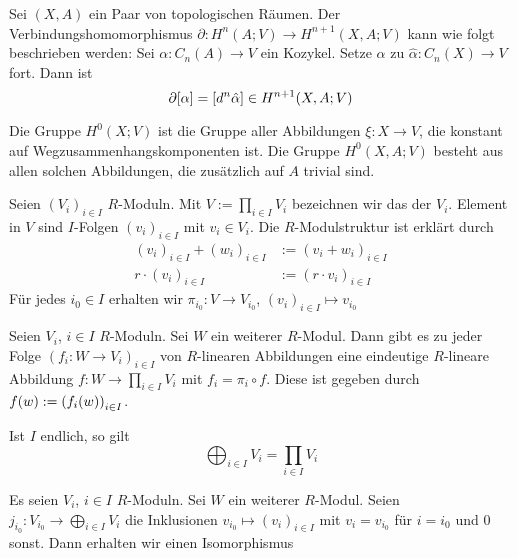 \begin{bemerkung}[{name=[Angabe des Verbindungshomomorphismus]}]
	Sei $(X,A)$ ein Paar von topologischen Räumen. Der Verbindungshomomorphismus $\partial \colon H^n(A;V) \to H^{n+1}(X,A;V)$ kann wie folgt beschrieben werden: Sei 
	$\alpha \colon C_n(A) \to V$ ein Kozykel. Setze $\alpha$ zu $\hat{\alpha} \colon C_n(X) \to V$ fort. Dann ist 
	\[
		\partial \benbrace{\alpha} = \benbrace*{d^n \hat{\alpha}} \in H^{n+1}(X,A;V)
	\]
\end{bemerkung}

\begin{beispiel}
	Die Gruppe $H^0(X;V)$ ist die Gruppe aller Abbildungen $\xi \colon X \to V$, die konstant auf Wegzusammenhangskomponenten ist. Die Gruppe $H^0(X,A;V)$ besteht aus allen 
	solchen Abbildungen, die zusätzlich auf $A$ trivial sind.
\end{beispiel}

\begin{definition}[{name=[Produkt von $R$-Moduln]}]
	Seien $(V_i)_{i \in I}$ $R$-Moduln. Mit $V := \prod_{i \in I} V_i$ bezeichnen wir das  der $V_i$. Element in $V$ sind $I$-Folgen $(v_i)_{i \in I}$ mit 
	$v_i \in V_i$. Die $R$-Modulstruktur ist erklärt durch
	\begin{align}
		(v_i)_{i \in I}+ (w_i)_{i \in I} &:= (v_i + w_i)_{i \in I} \\
		r \cdot (v_i)_{i \in I} &:= (r \cdot v_i)_{i \in I}
	\end{align}
	Für jedes $i_0 \in I$ erhalten wir $\pi_{i_0} \colon V \to V_{i_0}$, $(v_i)_{i \in I} \mapsto v_{i_0}$
\end{definition}

\begin{bemerkung}[name={Universelle Eigenschaft des Produktes}]
	Seien $V_i$, $i \in I$ $R$-Moduln. Sei $W$ ein weiterer $R$-Modul. Dann gibt es zu jeder Folge $(f_i \colon W \to V_i)_{i \in I}$ von $R$-linearen Abbildungen eine eindeutige 
	$R$-lineare Abbildung $f \colon W \to \prod_{i \in I}V_i$ mit $f_i= \pi_i \circ f$. Diese ist gegeben durch
	$f(w) := \enbrace*{f_i(w)}_{i \in I}$.
\end{bemerkung}

\begin{bemerkung}
	Ist $I$ endlich, so gilt
	\[
		\bigoplus_{i \in I} V_i = \prod_{i \in I} V_i
	\]
\end{bemerkung}

\begin{bemerkung}
	Es seien $V_i$, $i \in I$ $R$-Moduln. Sei $W$ ein weiterer $R$-Modul. Seien $j_{i_0} \colon V_{i_0} \to \bigoplus_{i \in I}V_i$ die Inklusionen $v_{i_0} \mapsto (v_i)_{i \in I}$
	mit $v_i =v_{i_0}$ für $i=i_0$ und $0$ sonst. Dann erhalten wir einen Isomorphismus
\end{bemerkung}

